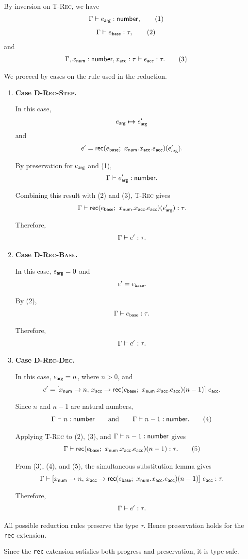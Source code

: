 \documentclass[11pt]{article}
\begin{document}
By inversion on \textsc{T-Rec}, we have
\[
\Gamma \vdash e_{\mathsf{arg}} : \mathsf{number},
\tag{1}
\]
\[
\Gamma \vdash e_{\mathsf{base}} : \tau,
\tag{2}
\]
and
\[
\typeJ{
  \ctx,
  \hasType{x_\msf{num}}{\tnum},
  \hasType{x_\msf{acc}}{\tau}}
  {e_\msf{acc}}
  {\tau}.
\tag{3}
\]

We proceed by cases on the rule used in the reduction.

\begin{enumerate}
  \item \textbf{Case \textsc{D-Rec-Step}.}

  In this case,
  \[
  e_{\mathsf{arg}} \boldsymbol{\mapsto} e_{\mathsf{arg}}'
  \]
  and
  \[
  e' =
  \mathsf{rec}(e_{\mathsf{base}}; ~ x_{\mathsf{num}}.x_{\mathsf{acc}}.e_{\mathsf{acc}})(e_{\mathsf{arg}}').
  \]

  By preservation for $e_{\mathsf{arg}}$ and (1),
  \[
  \Gamma \vdash e_{\mathsf{arg}}' : \mathsf{number}.
  \]

  Combining this result with (2) and (3), \textsc{T-Rec} gives
  \[
  \Gamma \vdash 
    \mathsf{rec}(e_{\mathsf{base}}; ~ x_{\mathsf{num}}.x_{\mathsf{acc}}.e_{\mathsf{acc}})(e_{\mathsf{arg}}')
   : \tau.
  \]

  Therefore,
  \[
  \Gamma \vdash e' : \tau.
  \]

  \item \textbf{Case \textsc{D-Rec-Base}.}

  In this case, $e_{\mathsf{arg}}=0$ and
  \[
  e'=e_{\mathsf{base}}.
  \]

  By (2),
  \[
  \Gamma \vdash e_{\mathsf{base}} : \tau.
  \]

  Therefore,
  \[
  \Gamma \vdash e' : \tau.
  \]

  \item \textbf{Case \textsc{D-Rec-Dec}.}

  In this case, $e_{\mathsf{arg}}=n$, where $n>0$, and
  \[
  e' =
  [x_{\mathsf{num}} \rightarrow n,\,
   x_{\mathsf{acc}} \rightarrow
     \mathsf{rec}(e_{\mathsf{base}}; ~ x_{\mathsf{num}}.x_{\mathsf{acc}}.e_{\mathsf{acc}})(n-1)]
  \ e_{\mathsf{acc}}.
  \]

  Since $n$ and $n-1$ are natural numbers,
  \[
  \Gamma \vdash n : \mathsf{number}
  \qquad\text{and}\qquad
  \Gamma \vdash n-1 : \mathsf{number}.
  \tag{4}
  \]

  Applying \textsc{T-Rec} to (2), (3), and
  $\Gamma \vdash n-1 : \mathsf{number}$ gives
  \[
  \Gamma \vdash 
    \mathsf{rec}(e_{\mathsf{base}}; ~ x_{\mathsf{num}}.x_{\mathsf{acc}}.e_{\mathsf{acc}})(n-1)
   : \tau.
  \tag{5}
  \]

  From (3), (4), and (5), the simultaneous substitution lemma gives
  \[
  \Gamma \vdash 
    [x_{\mathsf{num}} \rightarrow n,\,
     x_{\mathsf{acc}} \rightarrow
       \mathsf{rec}(e_{\mathsf{base}}; ~ x_{\mathsf{num}}.x_{\mathsf{acc}}.e_{\mathsf{acc}})(n-1)]
    \ e_{\mathsf{acc}}
   : \tau.
  \]

  Therefore,
  \[
  \Gamma \vdash e' : \tau.
  \]
\end{enumerate}

All possible reduction rules preserve the type $\tau$. Hence
preservation holds for the \texttt{rec} extension.

Since the \texttt{rec} extension satisfies both progress and
preservation, it is type safe.
\end{document}
